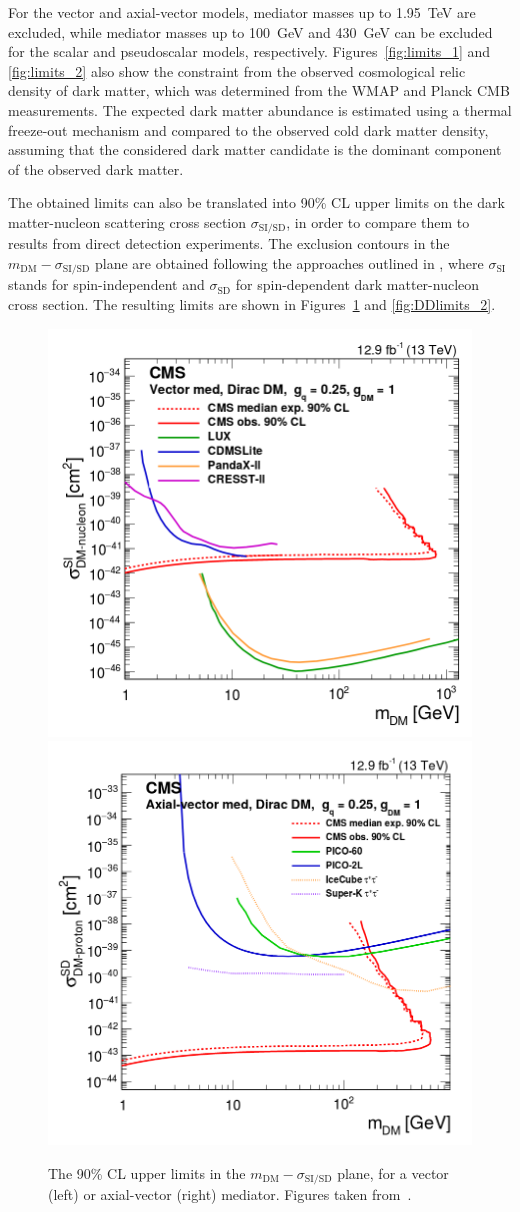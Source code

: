 For the vector and axial-vector models, mediator masses up to \SI{1.95}{TeV} are excluded, while mediator masses up to \SI{100}{GeV} and \SI{430}{GeV} can be excluded for the scalar and pseudoscalar models, respectively. Figures~\ref{fig:limits_1} and \ref{fig:limits_2} also show the constraint from the observed cosmological relic density of dark matter, which was determined from the WMAP and Planck \ac{CMB} measurements. The expected dark matter abundance is estimated using a thermal freeze-out mechanism and compared to the observed cold dark matter density, assuming that the considered dark matter candidate is the dominant component of the observed dark matter.

The obtained limits can also be translated into 90\% CL upper limits on the dark matter-nucleon scattering cross section $\sigma_{\mathrm{SI/SD}}$, in order to compare them to results from direct detection experiments. The exclusion contours in the $m_{\mathrm{DM}}-\sigma_{\mathrm{SI/SD}}$ plane are obtained following the approaches outlined in \cite{Buchmueller:2014yoa, Kurylov:2003ra, Hisano:2010ct}, where $\sigma_{\mathrm{SI}}$ stands for spin-independent and $\sigma_{\mathrm{SD}}$ for spin-dependent dark matter-nucleon cross section. The resulting limits are shown in Figures~\ref{fig:DDlimits_1} and \ref{fig:DDlimits_2}.

\begin{figure}[ht]
  \centering
 \includegraphics[width=.49\textwidth]{vector_DD.png} 
 \includegraphics[width=.49\textwidth]{axial_DD.png} 
 \caption{The 90\% CL upper limits in the  $m_{\mathrm{DM}}-\sigma_{\mathrm{SI/SD}}$ plane, for a vector (left) or axial-vector (right) mediator. Figures taken from~\cite{Sirunyan:2017hci}.}
 \label{fig:DDlimits_1}
\end{figure}

